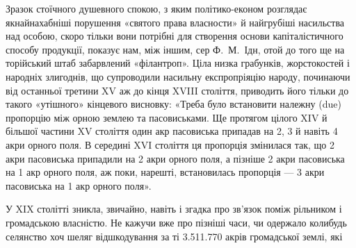 Зразок стоїчного душевного спокою, з яким політико-економ
розглядає якнайнахабніші порушення «святого права власности»
й найгрубіші насильства над особою, скоро тільки вони
потрібні для створення основи капіталістичного способу продукції,
показує нам, між іншим, сер Ф.~М.~Ідн, отой до того
ще на торійський штаб забарвлений «філантроп». Ціла низка грабунків,
жорстокостей і народніх злигоднів, що супроводили насильну
експропріяцію народу, починаючи від останньої третини
XV аж до кінця XVIII століття, приводить його тільки до
такого «утішного» кінцевого висновку: «Треба було встановити
належну (due) пропорцію між орною землею та пасовиськами.
Ще протягом цілого XIV й більшої частини XV століття
один акр пасовиська припадав на 2, 3 й навіть 4 акри орного
поля. В середині XVI століття ця пропорція змінилася так, що
2 акри пасовиська припадили на 2 акри орного поля, а пізніше
2 акри пасовиська на 1 акр орного поля, аж поки, нарешті, встановилась
пропорція — 3 акри пасовиська на 1 акр орного поля».

У XIX столітті зникла, звичайно, навіть і згадка про зв’язок
поміж рільником і громадською власністю. Не кажучи вже
про пізніші часи, чи одержало колибудь селянство хоч шеляг
відшкодування за ті \num{3.511.770} акрів громадської землі, які
\parbreak{}  %

